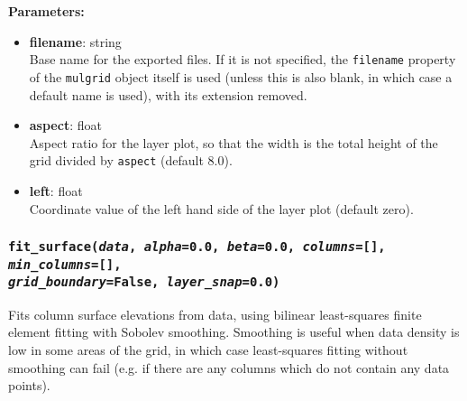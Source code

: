 \textbf{Parameters:}
\begin{itemize}
\item \textbf{filename}: string\\
  Base name for the exported files.  If it is not specified, the \texttt{filename} property of the \texttt{mulgrid} object itself is used (unless this is also blank, in which case a default name is used), with its extension removed.
\item \textbf{aspect}: float\\
  Aspect ratio for the layer plot, so that the width is the total height of the grid divided by \texttt{aspect} (default 8.0).
\item \textbf{left}: float\\
  Coordinate value of the left hand side of the layer plot (default zero).
\end{itemize}

\subsubsection{\texttt{fit\_surface(\emph{data}, \emph{alpha}=0.0, \emph{beta}=0.0, \emph{columns}=[], \emph{min\_columns}=[], \\
    \emph{grid\_boundary}=False, \emph{layer\_snap}=0.0)}}

Fits column surface elevations from data, using bilinear least-squares finite element fitting with Sobolev smoothing.  Smoothing is useful when data density is low in some areas of the grid, in which case least-squares fitting without smoothing can fail (e.g. if there are any columns which do not contain any data points).

